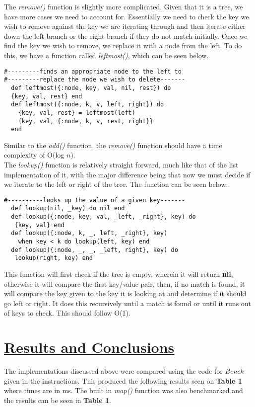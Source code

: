 \documentclass[a4paper,11pt]{article}
\begin{document}
The \textit{remove()} function is slightly more complicated. Given that it is a tree, we have more cases we need to account for. Essentially we need to check the key we wish to remove against the key we are iterating through and then iterate either down the left branch or the right branch if they do not match initially. Once we find the key we wish to remove, we replace it with a node from the left. To do this, we have a function called \textit{leftmost()}, which can be seen below.
\begin{verbatim}
#---------finds an appropriate node to the left to
#---------replace the node we wish to delete-------
  def leftmost({:node, key, val, nil, rest}) do 
  {key, val, rest} end
  def leftmost({:node, k, v, left, right}) do
    {key, val, rest} = leftmost(left)
    {key, val, {:node, k, v, rest, right}}
  end
\end{verbatim}
Similar to the \textit{add()} function, the \textit{remove()} function should have a time complexity of O(log $n$).\\

The \textit{lookup()} function is relatively straight forward, much like that of the list implementation of it, with the major difference being that now we must decide if we iterate to the left or right of the tree. The function can be seen below.
\begin{verbatim}
#----------looks up the value of a given key-------
  def lookup(nil, _key) do nil end
  def lookup({:node, key, val, _left, _right}, key) do
   {key, val} end
  def lookup({:node, k, _, left, _right}, key) 
  	when key < k do lookup(left, key) end
  def lookup({:node, _, _, _left, right}, key) do
   lookup(right, key) end
\end{verbatim}

This function will first check if the tree is empty, wherein it will return \textbf{nil}, otherwise it will compare the first key/value pair, then, if no match is found, it will compare the key given to the key it is looking at and determine if it should go left or right. It does this recursively until a match is found or until it runs out of keys to check. This should follow O(1).

\section*{
	\underline{Results and Conclusions}
}
The implementations discussed above were compared using the code for \textit{Bench} given in the instructions. This produced the following results seen on \textbf{Table 1} where times are in ms. The built in \textit{map()} function was also benchmarked and the results can be seen in \textbf{Table 1}.
\end{document}
